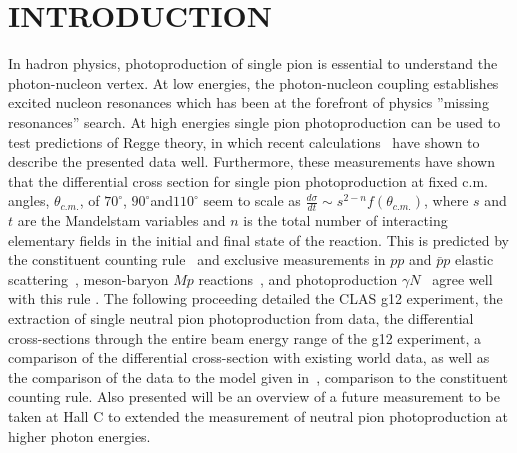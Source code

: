 \documentclass{aip-cp}
\begin{document}
\section{INTRODUCTION}
In hadron physics, photoproduction of single pion is essential to understand the photon-nucleon vertex. At low energies, the photon-nucleon coupling establishes excited nucleon resonances which has been at the forefront of physics ''missing resonances'' search. At high energies single pion photoproduction can be used to test predictions of Regge theory, in which recent calculations~\cite{JPAC} have shown to describe the presented data well. Furthermore, these measurements have shown that the differential cross section for single pion photoproduction at fixed c.m. angles, $\theta_{c.m.}$, of $70^{\circ}$, $90^{\circ}$and$110^{\circ}$ seem to scale as $\frac{d\sigma}{dt} \sim s^{2-n}f(\theta_{c.m.})$, where $s$ and $t$ are the Mandelstam variables and $n$ is the total number of interacting elementary fields in the initial and final state of the reaction. This is predicted by the constituent counting rule~\cite{scaling1,scaling2} and exclusive measurements in $pp$ and  $\bar{p}p$ elastic scattering~\cite{scalingexp5, scalingexp7}, meson-baryon $M p$ reactions~\cite{scalingexp7}, and photoproduction $\gamma N$~\cite{scalingexp2, scalingexp3, scalingexp4, scalingexp6, scalingexp8, scalingexp9, scalingexp10, scalingexp11}  agree well with this rule . The following proceeding detailed the CLAS g12 experiment, the extraction of single neutral pion photoproduction from data, the differential cross-sections through the entire beam energy range of the g12 experiment, a comparison of the differential cross-section with existing world data, as well as the comparison of the data to the model given in~\cite{JPAC}, comparison to the constituent counting rule. Also presented will be an overview of a future measurement to be taken at Hall C to extended the measurement of neutral pion photoproduction at higher photon energies.
\end{document}
